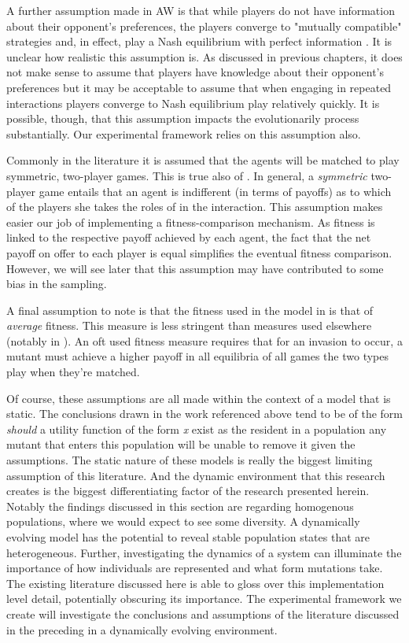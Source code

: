 \documentclass[11pt]{book}
\newcommand*{\np}{\par\noindent\newline}
\begin{document}
\np A further assumption made in AW is that while players do not have information about their 
opponent's preferences,
the players converge to "mutually compatible" strategies and, in effect, play a Nash equilibrium with perfect information \citep[p. ~46]{alger_generalization_2012}.
It is unclear how realistic this assumption is. 
As discussed in previous chapters, it does not make sense to assume that players have knowledge about their opponent's preferences 
but it may be acceptable to assume that when engaging in repeated interactions players converge to Nash equilibrium play relatively quickly.
It is possible, though, that this assumption impacts the evolutionarily process substantially. 
Our experimental framework relies on this assumption also.

\np Commonly in the literature it is assumed that the agents will be matched to play symmetric, two-player games.
This is true also of \citet{alger_generalization_2012}.
In general, a \textit{symmetric} two-player game entails that an agent is indifferent (in terms of payoffs) as to which of the players she takes the roles of in the interaction.
This assumption makes easier our job of implementing a fitness-comparison mechanism.
As fitness is linked to the respective payoff achieved by each agent, the fact that the net payoff on offer to each player is equal simplifies the eventual fitness comparison.
However, we will see later that this assumption may have contributed to some bias in the sampling.

\np A final assumption to note is that the fitness used in the model in \citet{alger_generalization_2012} is that of \textit{average} fitness.
This measure is less stringent than measures used elsewhere (notably in \citet{alger_homo_2013}). 
An oft used fitness measure requires that for an invasion to occur, a mutant must achieve a higher payoff in all equilibria of all games the two types play when they're matched.

\np Of course, these assumptions are all made within the context of a model that is static.
The conclusions drawn in the work referenced above tend to be of the form \textit{should} a utility function of the form \textit{x} exist as the resident in a population any mutant that enters this population will be unable to remove it given the assumptions.
The static nature of these models is really the biggest limiting assumption of this literature.
And the dynamic environment that this research creates is the biggest differentiating factor of the research presented herein.
Notably the findings discussed in this section are regarding homogenous populations, where we would expect to see some diversity.
A dynamically evolving model has the potential to reveal stable population states that are heterogeneous.
Further, investigating the dynamics of a system can illuminate the importance of how individuals are represented and what form mutations take.
The existing literature discussed here is able to gloss over this implementation level detail, potentially obscuring its importance.
The experimental framework we create will investigate the conclusions and assumptions of the literature discussed in the preceding in a dynamically evolving environment.
\end{document}
